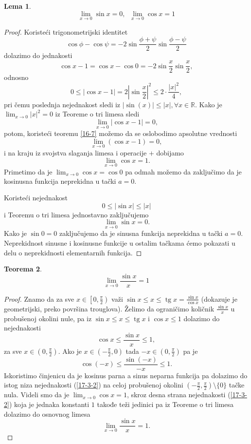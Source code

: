 \documentclass[a4paper,12pt]{article}
\theoremstyle{plain}
\newtheorem{theorem}{Teorema}[section]
\newtheorem{lemma}[theorem]{Lema}
\theoremstyle{definition}
\theoremstyle{remark}
\begin{document}
\begin{lemma} 
    \[\lim_{x \to 0} \sin x = 0,\;\; \lim_{x \to 0} \cos x = 1\]
\end{lemma}    
\begin{proof}
Koristeći trigonometrijski identitet
\[ \cos \phi - \cos \psi = -2 \sin \frac{\phi + \psi}{2} \sin \frac{\phi - \psi}{2} \]
dolazimo do jednakosti
\[ \cos x - 1 = \cos x - \cos 0 = -2 \sin \frac{x}{2} \sin \frac{x}{2}, \]
odnosno
\[ 0 \le |\cos x - 1| = 2 \left| \sin \frac{x}{2} \right|^2 \le 2 \cdot \frac{|x|^2}{4}, \]
pri čemu poslednja nejednakost sledi iz $\displaystyle |\sin(x)| \leq |x|, \forall x \in \mathbb{R}$. Kako je $\displaystyle \lim_{x \to 0} |x|^2 = 0$ iz Teoreme o tri limesa sledi
\[ \lim_{x \to 0} |\cos x - 1| = 0, \]
potom, koristeći teoremu \ref{16-7} možemo da se oslobodimo apsolutne vrednosti
\[ \lim_{x \to 0} (\cos x - 1) = 0, \]
i na kraju iz svojstva slaganja limesa i operacije $+$ dobijamo
\[ \lim_{x \to 0} \cos x = 1. \]
Primetimo da je $\displaystyle \lim_{x \to 0} \cos x = \cos 0$ pa odmah možemo da zaključimo da je kosinusna funkcija neprekidna u tački $a = 0$.

Koristeći nejednakost
\[ 0 \le |\sin x| \le |x| \]
i Teoremu o tri limesa jednostavno zaključujemo
\[ \lim_{x \to 0} \sin x = 0. \]
Kako je $\sin 0 = 0$ zaključujemo da je sinusna funkcija neprekidna u tački $a = 0$. Neprekidnost sinusne i kosinusne funkcije u ostalim tačkama ćemo pokazati u delu o neprekidnosti elementarnih funkcija.
\end{proof}
\begin{theorem}
    \[ \lim_{x \to 0} \frac{\sin x}{x} = 1 \]
\end{theorem}
\begin{proof}
    Znamo da za sve $x \in \left[0, \frac{\pi}{2}\right)$ važi
$\displaystyle \sin x \le x \le \operatorname{tg} x = \frac{\sin x}{\cos x} $ (dokazuje je geometrijski, preko površina trouglova).
Želimo da ograničimo količnik $\frac{\sin x}{x}$ u probušenoj okolini nule, pa iz $\displaystyle \sin x \le x \le \operatorname{tg} x $ i $\cos x \leq 1$ dolazimo do nejednakosti
\begin{equation}
    \cos x \le \frac{\sin x}{x} \le 1,
    \label{17-3-2}
\end{equation}
za sve $x \in \left(0, \frac{\pi}{2}\right)$. Ako je $x \in \left(-\frac{\pi}{2}, 0\right)$ tada $-x \in \left(0, \frac{\pi}{2}\right)$ pa je
\[ \cos(-x) \le \frac{\sin(-x)}{-x} \le 1. \]
Iskoristimo činjenicu da je kosinus parna a sinus neparna funkcija pa dolazimo do istog niza nejednakosti (\ref{17-3-2}) na celoj probušenoj okolini $\left(-\frac{\pi}{2}, \frac{\pi}{2}\right) \setminus \{0\}$ tačke nula. Videli smo da je $\displaystyle \lim_{x \to 0} \cos x = 1$, skroz desna strana nejednakosti (\ref{17-3-2}) koja je jednaka konstanti $1$ takođe teži jedinici pa iz Teoreme o tri limesa dolazimo do osnovnog limesa
\begin{equation}
    \boxed{\lim_{x \to 0} \frac{\sin x}{x} = 1.}
\end{equation}
\end{proof}
\end{document}
